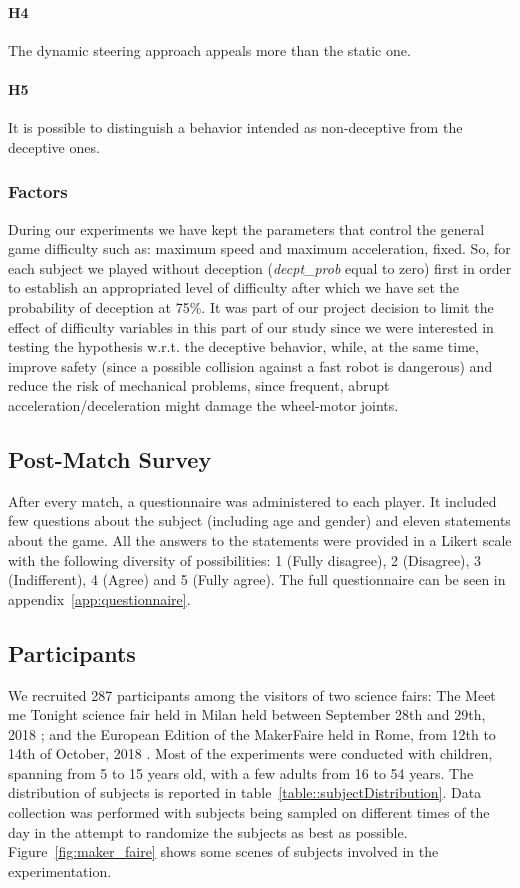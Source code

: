 \paragraph{H4} The dynamic steering approach appeals more than the static one.
\paragraph{H5} It is possible to distinguish a behavior intended as non-deceptive from the deceptive ones.

\subsubsection{Factors}
During our experiments we have kept the parameters that control the general game difficulty such as: maximum speed and maximum acceleration, fixed. So, for each subject we played without deception (\textit{decpt\_prob} equal to zero) first in order to establish an appropriated level of difficulty after which we have set the probability of deception at 75\%. It was part of our project decision to limit the effect of difficulty variables in this part of our study since we were interested in testing the hypothesis w.r.t. the deceptive behavior, while, at the same time, improve safety (since a possible collision against a fast robot is dangerous) and reduce the risk of mechanical problems, since frequent, abrupt acceleration/deceleration might damage the wheel-motor joints.

\subsection{Post-Match Survey}

After every match, a questionnaire was administered to each player. It included few questions about the subject (including age and gender) and eleven statements about the game. All the answers to the statements were provided in a Likert scale with the following diversity of possibilities: 1 (Fully disagree), 2 (Disagree), 3 (Indifferent), 4 (Agree) and 5 (Fully agree). The full questionnaire can be seen in appendix~\ref{app:questionnaire}. 

\subsection{Participants}
We recruited 287 participants among the visitors of two science fairs: The Meet me Tonight science fair held in Milan held between September 28th and 29th, 2018%
; and the European Edition of the MakerFaire held in Rome, from 12th to 14th of October, 2018%
. Most of the experiments were conducted with children, spanning from 5 to 15 years old, with a few adults from 16 to 54 years. The distribution of subjects is reported in table~\ref{table::subjectDistribution}. Data collection was performed with subjects being sampled on different times of the day in the attempt to randomize the subjects as best as possible. Figure~\ref{fig:maker_faire} shows some scenes of subjects involved in the experimentation.

